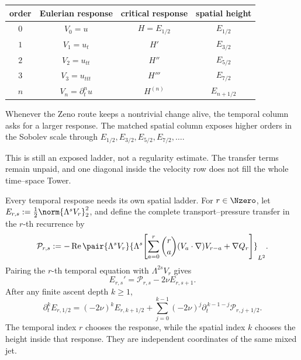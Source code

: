 \begin{center}
\captionsetup{hypcap=false}
\label{tab:BodyTemporalSpatialDiscovery}
\small
\renewcommand{\arraystretch}{1.2}
\begin{tabular}{@{}c c c c@{}}
\toprule
order & Eulerian response & critical response & spatial height \\
\midrule
\(0\) & \(V_0=u\) & \(H=E_{1/2}\) & \(E_{1/2}\) \\
\(1\) & \(V_1=u_t\) & \(H'\) & \(E_{3/2}\) \\
\(2\) & \(V_2=u_{tt}\) & \(H''\) & \(E_{5/2}\) \\
\(3\) & \(V_3=u_{ttt}\) & \(H'''\) & \(E_{7/2}\) \\
\(n\) & \(V_n=\partial_t^nu\) & \(H^{(n)}\) & \(E_{n+1/2}\) \\
\bottomrule
\end{tabular}
\end{center}

Whenever the Zeno route keeps a nontrivial change alive, the temporal column asks for a larger response.
The matched spatial column exposes higher orders in the Sobolev scale through
\(E_{1/2},E_{3/2},E_{5/2},E_{7/2},\ldots\).

This is still an exposed ladder, not a regularity estimate.
The transfer terms remain unpaid, and one diagonal inside the velocity row does not fill the whole time--space Tower.

Every temporal response needs its own spatial ladder.
For \(r\in\Nzero\), let \(E_{r,s}:=\tfrac12\norm{\Lambda^sV_r}_2^2\), and define the complete transport--pressure transfer in the \(r\)-th recurrence by
\[
  \mathcal P_{r,s}
  :=-
  \operatorname{Re}
  \pair{\Lambda^sV_r}
  {\Lambda^s\!\left[
    \sum_{a=0}^{r}\binom{r}{a}(V_a\cdot\nabla)V_{r-a}
    +\nabla Q_r
  \right]}_{L^2}.
\]
Pairing the \(r\)-th temporal equation with \(\Lambda^{2s}V_r\) gives
\begin{equation}\label{eq:BodyEveryTemporalRowSpatialEnergy}
  E_{r,s}'=\mathcal P_{r,s}-2\nu E_{r,s+1}.
\end{equation}
After any finite ascent depth \(k\geq1\),
\begin{equation}\label{eq:BodyEveryTemporalRowCompletedHeight}
  \partial_t^kE_{r,1/2}
  =(-2\nu)^kE_{r,k+1/2}
  +\sum_{j=0}^{k-1}
  (-2\nu)^j
  \partial_t^{\,k-1-j}\mathcal P_{r,j+1/2}.
\end{equation}
The temporal index \(r\) chooses the response, while the spatial index \(k\) chooses the height inside that response.
They are independent coordinates of the same mixed jet.


